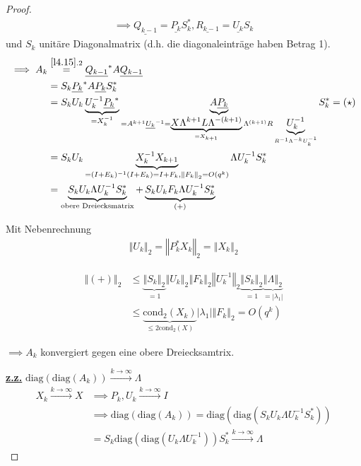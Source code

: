 \documentclass{book}
\def\cond{\text{cond}}
\begin{document}
\begin{proof}
                \begin{align*}
                    \implies \underline{Q_{k-1}}=\underline{P_k}S_k^*, \underline{R_{k-1}}=\underline{U_k}S_k
                \end{align*}
                und $S_k$ unitäre Diagonalmatrix (d.h. die diagonaleinträge haben Betrag 1).
                \begin{align*}
                    \implies A_k &\stackrel{\ref{l4.15}.2}{=}\underline{Q_{k-1}}^* A\underline{Q_{k-1}}\\
                    &=S_k\underline{P_k}^* A \underline{P_k}S_k^* \\
                    &=S_k U_k \underbrace{U_k^{-1}\underline{P_k}^*}_{=X_k^{-1}}\underbrace{A \underline{P_k}}_{=A^{k+1}\underline{U_k}^{-1}=\underbrace{X\Lambda^{k+1}L\Lambda^{-(k+1)}}_{=X_{k+1}}\Lambda^{(k+1)}R\underbrace{U_k^{-1}}_{R^{-1}\Lambda^{-k}U_k^{-1}}}S_k^* = (\star)\\
                    &= S_k U_k \underbrace{X^{-1}_kX_{k+1}}_{=(I+E_k)^{-1}(I+E_k)=I+F_k, \left\Vert F_k \right\Vert_2=O(q^k)}\Lambda U_{k}^{-1} S_k^*\\
                    &= \underbrace{S_k U_k\Lambda U_k^{-1}S_k^*}_{\text{obere Dreiecksmatrix}}+\underbrace{S_k U_kF_k\Lambda U_k^{-1}S_k^*}_{(+)}
                \end{align*}

                Mit Nebenrechnung 
                \begin{align*}
                    \left\Vert U_k \right\Vert_2 = \left\Vert P_k^* X_k \right\Vert_2 = \left\Vert X_k \right\Vert_2
                \end{align*}

                \begin{align*}
                    \left\Vert (+) \right\Vert_2 &\leq \underbrace{\left\Vert S_k \right\Vert_2}_{=1} \left\Vert U_k \right\Vert_2 \left\Vert F_k \right\Vert_2 \left\Vert U_k^{-1} \right\Vert_2 \underbrace{\left\Vert S_k \right\Vert_2}_{=1} \underbrace{\left\Vert \Lambda \right\Vert_2}_{=\left\vert \lambda_1 \right\vert}\\
                    &\leq \underbrace{\cond_2(X_k)}_{\leq 2\cond_2 (X)}\left\vert \lambda_1 \right\vert \left\Vert F_k \right\Vert_2=O(q^k)
                \end{align*}

                $\implies A_k$ konvergiert gegen eine obere Dreiecksamtrix.

                \underline{\textbf{z.z.}} $\text{diag}(\text{diag}(A_k))\stackrel{k \to\infty}{\to}\Lambda$
                \begin{align*}
                    X_k\stackrel{k \to\infty}{\to}X & \implies P_k,U_k\stackrel{k \to\infty}{\to} I \\
                    &\implies \text{diag}(\text{diag}(A_k))=\text{diag}(\text{diag}(S_kU_k\Lambda U_k^{-1}S_k^*))\\
                    &=S_k\text{diag}(\text{diag}(U_k\Lambda U_k^{-1}))S_k^*\stackrel{k\to\infty}{\to}\Lambda
                \end{align*}

            \end{proof}
\end{document}
